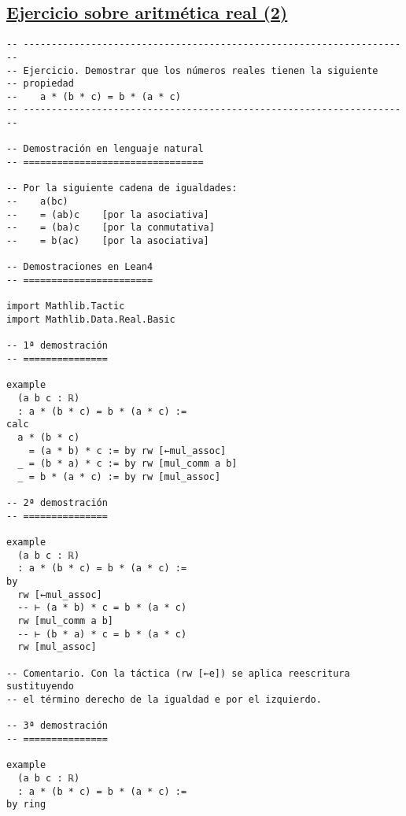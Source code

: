 \subsection{\href{./src/Basicos/Ejercicio\_sobre\_aritmetica\_real\_2.lean}{Ejercicio sobre aritmética real (2)}}
\label{sec:orgda80d99}
\begin{verbatim}
-- ---------------------------------------------------------------------
-- Ejercicio. Demostrar que los números reales tienen la siguiente
-- propiedad
--    a * (b * c) = b * (a * c)
-- ---------------------------------------------------------------------

-- Demostración en lenguaje natural
-- ================================

-- Por la siguiente cadena de igualdades:
--    a(bc)
--    = (ab)c    [por la asociativa]
--    = (ba)c    [por la conmutativa]
--    = b(ac)    [por la asociativa]

-- Demostraciones en Lean4
-- =======================

import Mathlib.Tactic
import Mathlib.Data.Real.Basic

-- 1ª demostración
-- ===============

example
  (a b c : ℝ)
  : a * (b * c) = b * (a * c) :=
calc
  a * (b * c)
    = (a * b) * c := by rw [←mul_assoc]
  _ = (b * a) * c := by rw [mul_comm a b]
  _ = b * (a * c) := by rw [mul_assoc]

-- 2ª demostración
-- ===============

example
  (a b c : ℝ)
  : a * (b * c) = b * (a * c) :=
by
  rw [←mul_assoc]
  -- ⊢ (a * b) * c = b * (a * c)
  rw [mul_comm a b]
  -- ⊢ (b * a) * c = b * (a * c)
  rw [mul_assoc]

-- Comentario. Con la táctica (rw [←e]) se aplica reescritura sustituyendo
-- el término derecho de la igualdad e por el izquierdo.

-- 3ª demostración
-- ===============

example
  (a b c : ℝ)
  : a * (b * c) = b * (a * c) :=
by ring
\end{verbatim}

